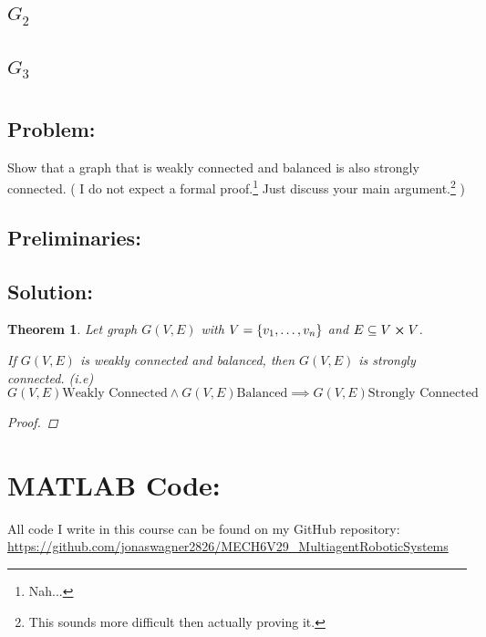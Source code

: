\documentclass[]{article}
\numberwithin{equation}{section}
\newtheorem{theorem}{Theorem}
\begin{document}
\subsection{$G_2$}








\subsection{$G_3$}







\newpage
\section{}
\subsection*{Problem:}
Show that a graph that is weakly connected and balanced is also strongly connected.
(
    I do not expect a formal proof.\footnote{
        Nah...
    }
    Just discuss your main argument.\footnote{
        This sounds more difficult then actually proving it.
    }
)

\subsection*{Preliminaries:}




\subsection*{Solution:}
\begin{theorem}
    Let graph $G(V,E)$ with $V = \qty{v_1,\dots,v_n}$ and $E \subseteq V \cross V$.

    If $G(V,E)$ is weakly connected and balanced, then $G(V,E)$ is strongly connected.
    (i.e)\[
        G(V,E) \text{Weakly Connected} 
            \land G(V,E) \text{Balanced}
            \implies G(V,E) \text{Strongly Connected}
    \]
    \begin{proof}
        
    \end{proof}
\end{theorem}









\newpage
\appendix
\section{MATLAB Code:}\label{apx:matlab}
All code I write in this course can be found on my GitHub repository:\\
\href{https://github.com/jonaswagner2826/MECH6V29_MultiagentRoboticSystems}{https://github.com/jonaswagner2826/MECH6V29\_MultiagentRoboticSystems}


% 
\cite{*}
\end{document}
